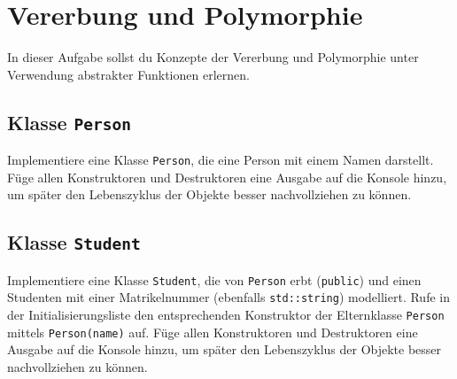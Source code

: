 \section{\ExercisePrefixObjectOrientation Vererbung und Polymorphie}\label{sec:inheritance}
In dieser Aufgabe sollst du Konzepte der Vererbung und Polymorphie unter Verwendung abstrakter Funktionen erlernen.

\subsection{Klasse \lstinline{Person}}
Implementiere eine Klasse \lstinline{Person}, die eine Person mit einem Namen darstellt.
Füge allen Konstruktoren und Destruktoren eine Ausgabe auf die Konsole hinzu, um später den Lebenszyklus der Objekte besser nachvollziehen zu können.



\subsection{Klasse \lstinline{Student}}
Implementiere eine Klasse \lstinline{Student}, die von \lstinline{Person} erbt (\lstinline{public}) und einen Studenten mit einer Matrikelnummer (ebenfalls \lstinline{std::string}) modelliert.
Rufe in der Initialisierungsliste den entsprechenden Konstruktor der Elternklasse \lstinline{Person} mittels \lstinline{Person(name)} auf.
Füge allen Konstruktoren und Destruktoren eine Ausgabe auf die Konsole hinzu, um später den Lebenszyklus der Objekte besser nachvollziehen zu können.



